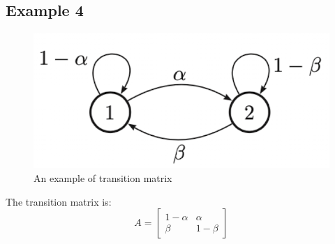 \subsection{Example 4}
\begin{figure}[H]
    \centering
    \includegraphics[width = .4\linewidth]{figures/appendix/appendix_1.png}
    \caption{An example of transition matrix}
    \label{fig:transition-example}
\end{figure}
The transition matrix is:
$$
A=\left[\begin{array}{cc}
1-\alpha & \alpha \\
\beta & 1-\beta
\end{array}\right]
$$

